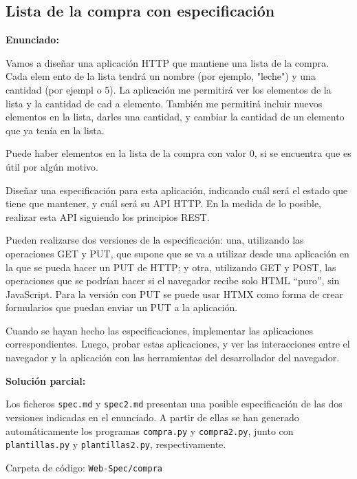 \subsection{Lista de la compra con especificación}
\label{subsec:lista-compra-spec}

\textbf{Enunciado:}

Vamos a diseñar una aplicación HTTP que mantiene una lista de la compra. Cada elem ento de la lista tendrá un nombre (por ejemplo, "leche") y una cantidad (por ejempl o 5). La aplicación me permitirá ver los elementos de la lista y la cantidad de cad a elemento. También me permitirá incluir nuevos elementos en la lista, darles una cantidad, y cambiar la cantidad de un elemento que ya tenía en la lista.

Puede haber elementos en la lista de la compra con valor 0, si se encuentra que es útil por algún motivo.

Diseñar una especificación para esta aplicación, indicando cuál será el estado que tiene que mantener, y cuál será su API HTTP. En la medida de lo posible, realizar esta API siguiendo los principios REST.

Pueden realizarse dos versiones de la especificación: una, utilizando las operaciones GET y PUT, que supone que se va a utilizar desde una aplicación en la que se pueda hacer un PUT de HTTP; y otra, utilizando GET y POST, las operaciones que se podrían hacer si el navegador recibe solo HTML ``puro'', sin JavaScript. Para la versión con PUT se puede usar HTMX como forma de crear formularios que puedan enviar un PUT a la aplicación.

Cuando se hayan hecho las especificaciones, implementar las aplicaciones correspondientes. Luego, probar estas aplicaciones, y ver las interacciones entre el navegador y la aplicación con las herramientas del desarrollador del navegador.

\textbf{Solución parcial:}

Los ficheros \texttt{spec.md} y \texttt{spec2.md} presentan una posible especificación de las dos versiones indicadas en el enunciado. A partir de ellas se han generado automáticamente los programas \texttt{compra.py} y \texttt{compra2.py}, junto con \texttt{plantillas.py} y \texttt{plantillas2.py}, respectivamente.

Carpeta de código: \texttt{Web-Spec/compra}



